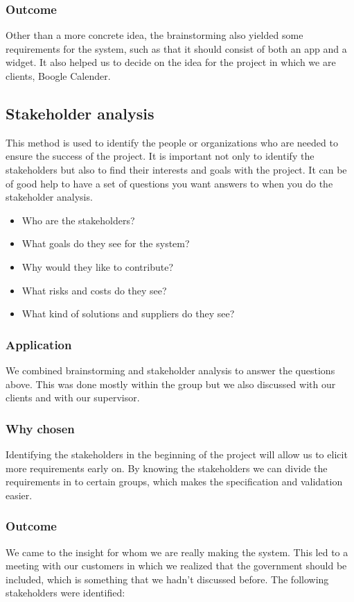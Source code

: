 \documentclass[a4paper]{article}
\begin{document}
		\subsubsection{Outcome}
		Other than a more concrete idea, the brainstorming also yielded some requirements for the system, such as that it should consist of both an app and a widget. It also helped us to decide on the idea for the project in which we are clients, Boogle Calender.

		\subsection{Stakeholder analysis}
 This method is used to identify the people or organizations who are needed to ensure the success of the project. It is important not only to identify the stakeholders but also to find their interests and goals with the project. It can be of good help to have a set of questions you want answers to when you do the stakeholder analysis.

		\begin{itemize}
			\item Who are the stakeholders?
			\item What goals do they see for the system?
			\item Why would they like to contribute?
			\item What risks and costs do they see?
			\item What kind of solutions and suppliers do they see?
		\end{itemize}
		
		\subsubsection{Application}
 We combined brainstorming and stakeholder analysis to answer the questions above. This was done mostly within the group but we also discussed with our clients and with our supervisor.
		\subsubsection{Why chosen}
		Identifying the stakeholders in the beginning of the project will allow us to elicit more requirements early on. By knowing the stakeholders we can divide the requirements in to certain groups, which makes the specification and validation easier.
		\subsubsection{Outcome}
We came to the insight for whom we are really making the system. This led to a meeting with our customers in which we realized that the government should be included, which is something that we hadn't discussed before.
	The following stakeholders were identified:
\end{document}
